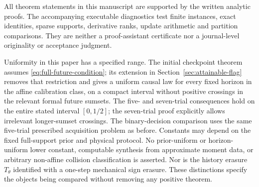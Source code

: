 All theorem statements in this manuscript are supported by the written
analytic proofs. The accompanying executable diagnostics test finite
instances, exact identities, sparse supports, derivative ranks, update
arithmetic and partition comparisons. They are neither a proof-assistant
certificate nor a journal-level originality or acceptance judgment.

Uniformity in this paper has a specified range. The initial checkpoint
theorem assumes \eqref{eq:full-future-condition}; its extension in
Section~\ref{sec:attainable-flag} removes that restriction and gives a
uniform causal law for every fixed horizon in the affine calibration
class, on a compact interval without positive crossings in the relevant
formal future sumsets. The five- and seven-trial consequences hold on
the entire stated interval $[0,1/2]$; the seven-trial proof explicitly
allows irrelevant longer-sumset crossings. The binary-decision comparison
uses the same five-trial prescribed acquisition problem as before.
Constants may depend on the fixed full-support prior and physical
protocol. No prior-uniform or horizon-uniform lower constant, computable
synthesis from approximate moment data, or arbitrary non-affine collision
classification is asserted. Nor is the history erasure $T_\theta$
identified with a one-step mechanical sign erasure. These distinctions
specify the objects being compared without removing any positive theorem.
